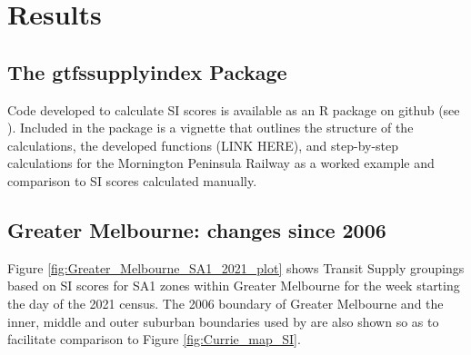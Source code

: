 \documentclass[preprint, 3p,
authoryear]{elsarticle} %
\begin{document}
\section{Results}\label{results}

\subsection{The gtfssupplyindex
Package}\label{the-gtfssupplyindex-package}

Code developed to calculate SI scores is available as an R package on
github (see \citet{gtfssupplyindex_github}). Included in the package is
a vignette that outlines the structure of the calculations, the
developed functions (LINK HERE), and step-by-step calculations for the
Mornington Peninsula Railway as a worked example and comparison to SI
scores calculated manually.

\subsection{Greater Melbourne: changes since
2006}\label{greater-melbourne-changes-since-2006}

Figure \ref{fig:Greater_Melbourne_SA1_2021_plot} shows Transit Supply
groupings based on SI scores for SA1 zones within Greater Melbourne for
the week starting the day of the 2021 census. The 2006 boundary of
Greater Melbourne and the inner, middle and outer suburban boundaries
used by \citet{currie2010identifying} are also shown so as to facilitate
comparison to Figure \ref{fig:Currie_map_SI}.
\end{document}
